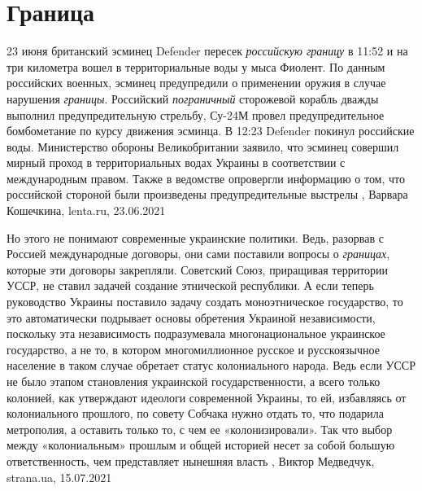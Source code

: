  
 
 
 
 
\chapter{Граница}
\label{sec:slova.granica}

23 июня британский эсминец Defender пересек \emph{российскую границу} в 11:52 и на три
километра вошел в территориальные воды у мыса Фиолент. По данным российских
военных, эсминец предупредили о применении оружия в случае нарушения \emph{границы}.
Российский \emph{пограничный} сторожевой корабль дважды выполнил предупредительную
стрельбу, Су-24М провел предупредительное бомбометание по курсу движения
эсминца. В 12:23 Defender покинул российские воды.  Министерство обороны
Великобритании заявило, что эсминец совершил мирный проход в территориальных
водах Украины в соответствии с международным правом. Также в ведомстве
опровергли информацию о том, что российской стороной были произведены
предупредительные выстрелы
, 
Варвара Кошечкина, lenta.ru, 23.06.2021

Но этого не понимают современные украинские политики. Ведь, разорвав с Россией
международные договоры, они сами поставили вопросы о \emph{границах}, которые
эти договоры закрепляли. Советский Союз, приращивая территории УССР, не ставил
задачей создание этнической республики. А если теперь руководство Украины
поставило задачу создать моноэтническое государство, то это автоматически
подрывает основы  обретения Украиной независимости, поскольку эта независимость
подразумевала многонациональное украинское государство, а не то, в котором
многомиллионное русское и русскоязычное население в таком случае обретает
статус колониального народа.  Ведь если УССР не было этапом становления
украинской государственности, а всего только колонией, как утверждают идеологи
современной Украины, то ей, избавляясь от колониального прошлого, по совету
Собчака нужно отдать то, что подарила метрополия, а оставить только то, с чем
ее «колонизировали». Так что выбор между «колониальным» прошлым и общей
историей несет за собой большую ответственность, чем представляет нынешняя
власть
, 
Виктор Медведчук, strana.ua, 15.07.2021
